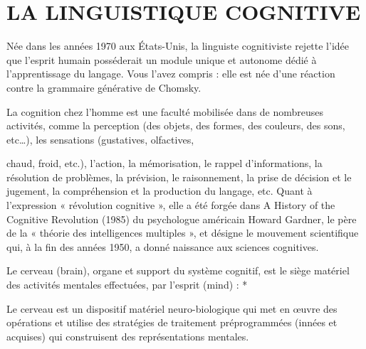 \section{LA LINGUISTIQUE COGNITIVE}

Née dans les années 1970 aux États-Unis, la linguiste cognitiviste rejette l’idée que l’esprit humain posséderait un module unique et autonome dédié à l’apprentissage du langage. Vous l’avez compris : elle est née d’une réaction contre la grammaire générative de Chomsky.\par


La cognition chez l’homme est une faculté mobilisée dans de nombreuses activités, comme la perception (des objets, des formes, des couleurs, des sons, etc…), les sensations (gustatives, olfactives,\par


chaud, froid, etc.), l’action, la mémorisation, le rappel d’informations, la résolution de problèmes, la prévision, le raisonnement, la prise de décision et le jugement, la compréhension et la production du langage, etc. Quant à l’expression « révolution cognitive », elle a été forgée dans A History of the Cognitive Revolution (1985) du psychologue américain Howard Gardner, le père de la « théorie des intelligences multiples », et désigne le mouvement scientifique qui, à la fin des années 1950, a donné naissance aux sciences cognitives.\par

 Le cerveau (brain), organe et support du système cognitif, est le siège matériel des activités mentales effectuées, par l’esprit (mind) : *\par

\noindent{\color{BellaTeal}$\diamond$}\hspace{.6em}Le cerveau est un dispositif matériel neuro-biologique qui met en œuvre des opérations et utilise des stratégies de traitement préprogrammées (innées et acquises) qui construisent des représentations mentales.\par

